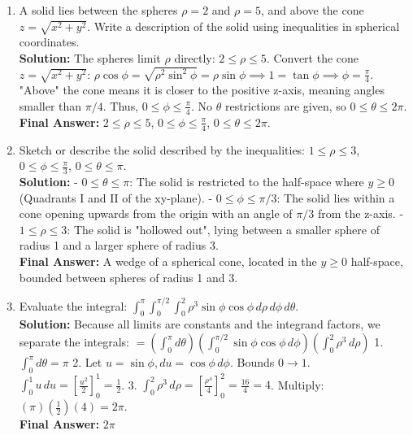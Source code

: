 \documentclass[11pt]{article}
\begin{document}
\begin{enumerate}[label=\textbf{\arabic*.}]
\item A solid lies between the spheres $\rho=2$ and $\rho=5$, and above the cone $z = \sqrt{x^2+y^2}$. Write a description of the solid using inequalities in spherical coordinates.\\
\textbf{Solution:} The spheres limit $\rho$ directly: $2 \le \rho \le 5$.
Convert the cone $z = \sqrt{x^2+y^2}$:
$\rho\cos\phi = \sqrt{\rho^2\sin^2\phi} = \rho\sin\phi \implies 1 = \tan\phi \implies \phi = \frac{\pi}{4}$.
"Above" the cone means it is closer to the positive z-axis, meaning angles smaller than $\pi/4$. Thus, $0 \le \phi \le \frac{\pi}{4}$. No $\theta$ restrictions are given, so $0 \le \theta \le 2\pi$.\\
\textbf{Final Answer:} $2 \le \rho \le 5$, $0 \le \phi \le \frac{\pi}{4}$, $0 \le \theta \le 2\pi$.

\item Sketch or describe the solid described by the inequalities: $1 \le \rho \le 3$, $0 \le \phi \le \frac{\pi}{3}$, $0 \le \theta \le \pi$.\\
\textbf{Solution:}
- $0 \le \theta \le \pi$: The solid is restricted to the half-space where $y \ge 0$ (Quadrants I and II of the xy-plane).
- $0 \le \phi \le \pi/3$: The solid lies within a cone opening upwards from the origin with an angle of $\pi/3$ from the z-axis.
- $1 \le \rho \le 3$: The solid is "hollowed out", lying between a smaller sphere of radius 1 and a larger sphere of radius 3. \\
\textbf{Final Answer:} A wedge of a spherical cone, located in the $y \ge 0$ half-space, bounded between spheres of radius 1 and 3.

\item Evaluate the integral: $\int_0^{\pi} \int_0^{\pi/2} \int_0^2 \rho^3 \sin\phi \cos\phi \, d\rho \, d\phi \, d\theta$.\\
\textbf{Solution:} Because all limits are constants and the integrand factors, we separate the integrals:
$= \left( \int_0^\pi d\theta \right) \left( \int_0^{\pi/2} \sin\phi \cos\phi \, d\phi \right) \left( \int_0^2 \rho^3 \, d\rho \right)$
1. $\int_0^\pi d\theta = \pi$
2. Let $u = \sin\phi, du = \cos\phi \, d\phi$. Bounds $0 \to 1$. $\int_0^1 u \, du = [\frac{u^2}{2}]_0^1 = \frac{1}{2}$.
3. $\int_0^2 \rho^3 \, d\rho = [\frac{\rho^4}{4}]_0^2 = \frac{16}{4} = 4$.
Multiply: $(\pi)(\frac{1}{2})(4) = 2\pi$.\\
\textbf{Final Answer:} $2\pi$


\end{enumerate}
\end{document}
